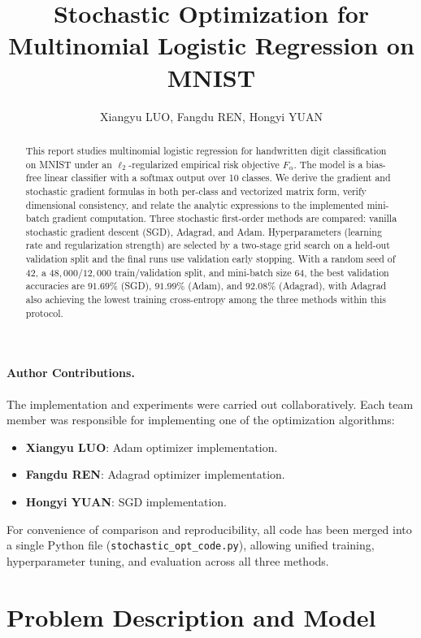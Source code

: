 \documentclass[11pt]{article}
\title{Stochastic Optimization for Multinomial Logistic Regression on MNIST}
\author{Xiangyu LUO, Fangdu REN, Hongyi YUAN}
\date{}
\numberwithin{equation}{section}
\numberwithin{table}{section}
\numberwithin{figure}{section}
\numberwithin{algorithm}{section}
\begin{document}
\maketitle

\begin{abstract}
This report studies multinomial logistic regression for handwritten digit classification on MNIST under an \(\ell_2\)-regularized empirical risk objective \(F_\alpha\). The model is a bias-free linear classifier with a softmax output over 10 classes. We derive the gradient and stochastic gradient formulas in both per-class and vectorized matrix form, verify dimensional consistency, and relate the analytic expressions to the implemented mini-batch gradient computation. Three stochastic first-order methods are compared: vanilla stochastic gradient descent (SGD), Adagrad, and Adam. Hyperparameters (learning rate and regularization strength) are selected by a two-stage grid search on a held-out validation split and the final runs use validation early stopping. With a random seed of 42, a \(48{,}000/12{,}000\) train/validation split, and mini-batch size 64, the best validation accuracies are \(91.69\%\) (SGD), \(91.99\%\) (Adam), and \(92.08\%\) (Adagrad), with Adagrad also achieving the lowest training cross-entropy among the three methods within this protocol.
\end{abstract}

\paragraph{Author Contributions.}
The implementation and experiments were carried out collaboratively. Each team member was responsible for implementing one of the optimization algorithms:
\begin{itemize}
    \item \textbf{Xiangyu LUO}: Adam optimizer implementation.
    \item \textbf{Fangdu REN}: Adagrad optimizer implementation.
    \item \textbf{Hongyi YUAN}: SGD implementation.
\end{itemize}
For convenience of comparison and reproducibility, all code has been merged into a single Python file (\texttt{stochastic\_opt\_code.py}), allowing unified training, hyperparameter tuning, and evaluation across all three methods.

\section{Problem Description and Model}
\end{document}
